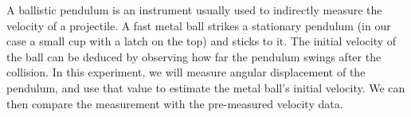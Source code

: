 



A ballistic pendulum is an instrument usually used to indirectly measure the velocity of a projectile. A fast metal ball strikes a stationary pendulum (in our case a small cup with a latch on the top) and sticks to it. The initial velocity of the ball can be deduced by observing how far the pendulum swings after the collision. In this experiment, we will measure angular displacement of the pendulum, and use that value to estimate the metal ball's initial velocity. We can then compare the measurement with the pre-measured velocity data. %

